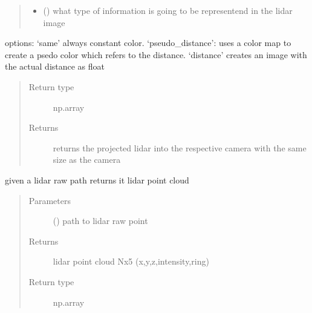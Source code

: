 \documentclass[letterpaper,10pt,english]{sphinxmanual}
\begin{document}
\begin{fulllineitems}
\begin{fulllineitems}
\begin{quote}
\begin{description}
\begin{itemize}
\item {} 
 () \textendash{} what type of information is going to be representend in the lidar image

\end{itemize}

\end{description}\end{quote}

options: ‘same’ always constant color. ‘pseudo\_distance’: uses a color map to create a psedo
color which refers to the distance. ‘distance’ creates an image with the actual distance as float
\begin{quote}\begin{description}
\item[{Return type}] \leavevmode
np.array

\item[{Returns}] \leavevmode
returns the projected lidar into the respective camera with the same size as the camera

\end{description}\end{quote}

\end{fulllineitems}


\begin{fulllineitems}
\label{\detokenize{radiate:radiate.Sequence.read_lidar}}
given a lidar raw path returns it lidar point cloud
\begin{quote}\begin{description}
\item[{Parameters}] \leavevmode
{} () \textendash{} path to lidar raw point

\item[{Returns}] \leavevmode
lidar point cloud Nx5 (x,y,z,intensity,ring)

\item[{Return type}] \leavevmode
np.array

\end{description}\end{quote}


\end{fulllineitems}
\end{fulllineitems}
\end{document}
